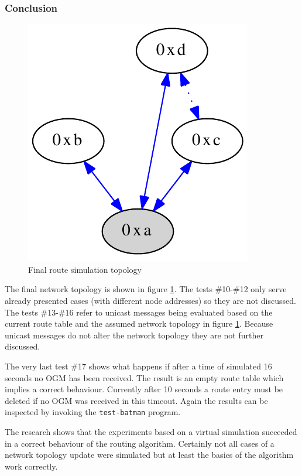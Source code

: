 \subsubsection{Conclusion}%
\begin{figure}[H]
  \begin{center}
    \includegraphics[]{figures/testfinal}
  \end{center}
  \caption{Final route simulation topology}
  \label{fig:testfinal}
\end{figure}

The final network topology is shown in figure \ref{fig:testfinal}. The tests \#10-\#12 only serve already presented cases (with different node addresses) so they are not discussed. The tests \#13-\#16 refer to unicast messages being evaluated based on the current route table and the assumed network topology in figure \ref{fig:testfinal}. Because unicast messages do not alter the network topology they are not further discussed.

The very last test \#17 shows what happens if after a time of simulated 16 seconds no OGM has been received. The result is an empty route table which implies a correct behaviour. Currently after 10 seconds a route entry must be deleted if no OGM was received in this timeout. Again the results can be inspected by invoking the \texttt{test-batman} program.

The research shows that the experiments based on a virtual simulation succeeded in a correct behaviour of the routing algorithm. Certainly not all cases of a network topology update were simulated but at least the basics of the algorithm work correctly.

